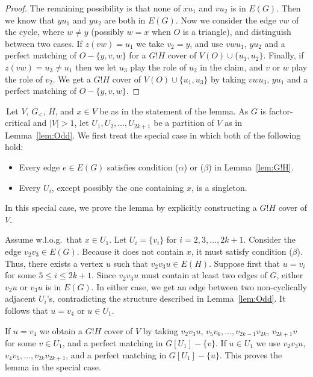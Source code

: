 \documentclass{article}
\theoremstyle{definition}
\begin{document}
\begin{proof}
The remaining possibility is that none of $xu_1$ and $vu_2$ is in $E(G)$. Then we know that $yu_1$ and $yu_2$ are both in $E(G)$. Now we consider the edge $vw$ of the cycle, where $w \ne y$ (possibly $w = x$ when $O$ is a triangle), and distinguish between two cases. If $z(vw) = u_1$ we take $v_2 = y$, and use $vwu_1$, $yu_2$ and a perfect matching of $O - \{y, v, w\}$ for a $G!H$ cover of $V(O) \cup \{u_1, u_2\}$. Finally, if $z(vw) = u_3 \ne u_1$ then we let $u_3$ play the role of $u_2$ in the claim, and $v$ or $w$ play the role of $v_2$. We get a $G!H$ cover of $V(O) \cup \{u_1, u_3\}$ by taking $vwu_3$, $yu_1$ and a perfect matching of $O - \{y, v, w\}$.
\end{proof}

\vspace{10pt}

 \,Let $V$, $G_<$, $H$, and $x \in V$ be as in the statement of the lemma. As $G$ is factor-critical and $|V| > 1$, let $U_1, U_2, \ldots , U_{2k+1}$ be a partition of $V$ as in Lemma~\ref{lem:Odd}. We first treat the special case in which both of the following hold:
\begin{itemize}
    \item Every edge $e \in E(G)$ satisfies condition ($\alpha$) or ($\beta$) in Lemma~\ref{lem:G!H}.
    \item Every $U_i$, except possibly the one containing $x$, is a singleton.
\end{itemize}
In this special case, we prove the lemma by explicitly constructing a $G!H$ cover of $V$.

Assume w.l.o.g.\ that $x \in U_1$. Let $U_i = \{v_i\}$ for $i=2,3, \ldots , 2k+1$. Consider the edge $v_2v_3 \in E(G)$. Because it does not contain $x$, it must satisfy condition ($\beta$). Thus, there exists a vertex $u$ such that $v_2v_3u \in E(H)$. Suppose first that $u = v_i$ for some $5 \le i \le 2k+1$. Since $v_2v_3u$ must contain at least two edges of $G$, either $v_2u$ or $v_3u$ is in $E(G)$. In either case, we get an edge between two non-cyclically adjacent $U_i$'s, contradicting the structure described in Lemma~\ref{lem:Odd}. It follows that $u = v_4$ or $u \in U_1$.

If $u = v_4$ we obtain a $G!H$ cover of $V$ by taking $v_2v_3u$, $v_5v_6, \ldots , v_{2k-1}v_{2k}$, $v_{2k+1}v$ for some $v \in U_1$, and a perfect matching in $G[U_1] - \{v\}$. If $u \in U_1$ we use $v_2v_3u$, $v_4v_5, \ldots , v_{2k}v_{2k+1}$, and a perfect matching in $G[U_1] - \{u\}$. This proves the lemma in the special case.
\end{document}
